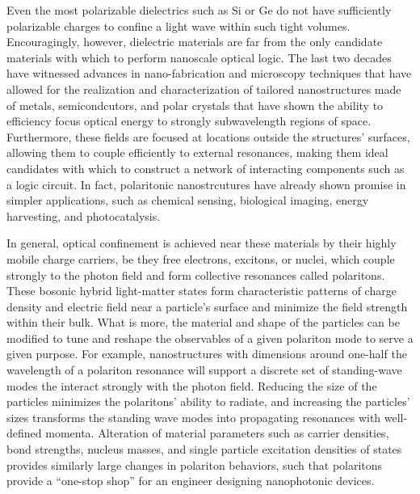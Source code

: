 \documentclass[11pt,a4paper]{article}
\begin{document}
Even the most polarizable dielectrics such as Si or Ge do not have sufficiently polarizable charges to confine a light wave within such tight volumes. Encouragingly, however, dielectric materials are far from the only candidate materials with which to perform nanoscale optical logic. The last two decades have witnessed advances in nano-fabrication and microscopy techniques that have allowed for the realization and characterization of tailored nanostructures made of metals, semicondcutors, and polar crystals that have shown the ability to efficiency focus optical energy to strongly subwavelength regions of space.\supercite{olafsson_electron_2020,jensen_nanosphere_2000,lagos_mapping_2017} Furthermore, these fields are focused at locations outside the structures' surfaces, allowing them to couple efficiently to external resonances, making them ideal candidates with which to construct a network of interacting components such as a logic circuit. In fact, polaritonic nanostrcutures have already shown promise in simpler applications, such as chemical sensing,\supercite{guo_plasmonic_2014} biological imaging,\supercite{zhou_copper-based_2016} energy harvesting,\supercite{wu_synthesis_2008} and photocatalysis.\supercite{jiang_boosting_2018}




In general, optical confinement is achieved near these materials by their highly mobile charge carriers, be they free electrons, excitons, or nuclei, which couple strongly to the photon field and form collective resonances called polaritons. These bosonic hybrid light-matter states form characteristic patterns of charge density and electric field near a particle's surface and minimize the field strength within their bulk. What is more, the material and shape of the particles can be modified to tune and reshape the observables of a given polariton mode to serve a given purpose. For example, nanostructures with dimensions around one-half the wavelength of a polariton resonance will support a discrete set of standing-wave modes the interact strongly with the photon field. Reducing the size of the particles minimizes the polaritons' ability to radiate, and increasing the particles' sizes transforms the standing wave modes into propagating resonances with well-defined momenta.\supercite{wei_plasmon_2018} Alteration of material parameters such as carrier densities, bond strengths, nucleus masses, and single particle excitation densities of states provides similarly large changes in polariton behaviors, such that polaritons provide a ``one-stop shop'' for an engineer designing nanophotonic devices.\supercite{luther_localized_2011,foteinopoulou_phonon-polaritonics_2019}
\end{document}
